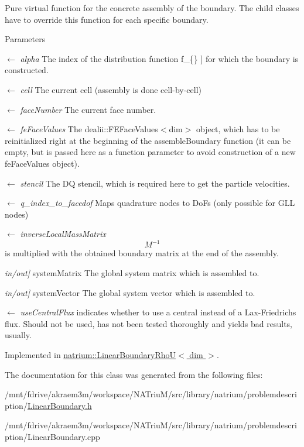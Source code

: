Pure virtual function for the concrete assembly of the boundary. The child classes have to override this function for each specific boundary. 
\begin{DoxyParams}{Parameters}
\item[\mbox{$\leftarrow$} {\em alpha}]The index of the distribution function  f\_\-\{\} \mbox{]} for which the boundary is constructed. \item[\mbox{$\leftarrow$} {\em cell}]The current cell (assembly is done cell-\/by-\/cell) \item[\mbox{$\leftarrow$} {\em faceNumber}]The current face number. \item[\mbox{$\leftarrow$} {\em feFaceValues}]The dealii::FEFaceValues$<$dim$>$ object, which has to be reinitialized right at the beginning of the assembleBoundary function (it can be empty, but is passed here as a function parameter to avoid construction of a new feFaceValues object). \item[\mbox{$\leftarrow$} {\em stencil}]The DQ stencil, which is required here to get the particle velocities. \item[\mbox{$\leftarrow$} {\em q\_\-index\_\-to\_\-facedof}]Maps quadrature nodes to DoFs (only possible for GLL nodes) \item[\mbox{$\leftarrow$} {\em inverseLocalMassMatrix}]\[ M^{-1} \] is multiplied with the obtained boundary matrix at the end of the assembly. \item[{\em in/out\mbox{]}}]systemMatrix The global system matrix which is assembled to. \item[{\em in/out\mbox{]}}]systemVector The global system vector which is assembled to. \item[\mbox{$\leftarrow$} {\em useCentralFlux}]indicates whether to use a central instead of a Lax-\/Friedrichs flux. Should not be used, has not been tested thoroughly and yields bad results, usually. \end{DoxyParams}


Implemented in \hyperlink{classnatrium_1_1LinearBoundaryRhoU_a9fecb00df16c4294d9852222ddbdb4ca}{natrium::LinearBoundaryRhoU$<$ dim $>$}.

The documentation for this class was generated from the following files:\begin{DoxyCompactItemize}
\item 
/mnt/fdrive/akraem3m/workspace/NATriuM/src/library/natrium/problemdescription/\hyperlink{LinearBoundary_8h}{LinearBoundary.h}\item 
/mnt/fdrive/akraem3m/workspace/NATriuM/src/library/natrium/problemdescription/LinearBoundary.cpp\end{DoxyCompactItemize}
